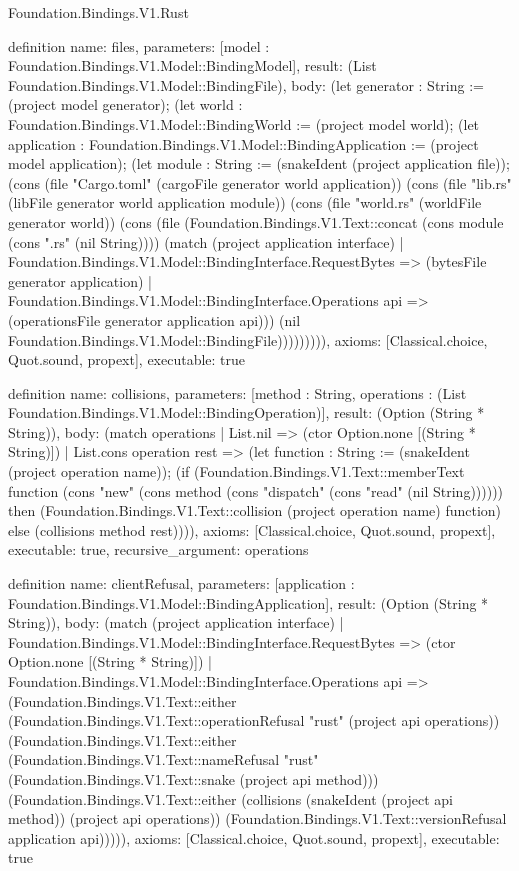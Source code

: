 \begin{lexlean}{Foundation.Bindings.V1.Rust}
\begin{semanticmodule}
definition{
  name: files,
  parameters: [model : Foundation.Bindings.V1.Model::BindingModel],
  result: (List Foundation.Bindings.V1.Model::BindingFile),
  body: (let generator : String := (project model generator); (let world : Foundation.Bindings.V1.Model::BindingWorld := (project model world); (let application : Foundation.Bindings.V1.Model::BindingApplication := (project model application); (let module : String := (snakeIdent (project application file)); (cons (file "Cargo.toml" (cargoFile generator world application)) (cons (file "lib.rs" (libFile generator world application module)) (cons (file "world.rs" (worldFile generator world)) (cons (file (Foundation.Bindings.V1.Text::concat (cons module (cons ".rs" (nil String)))) (match (project application interface)
    | Foundation.Bindings.V1.Model::BindingInterface.RequestBytes => (bytesFile generator application)
    | Foundation.Bindings.V1.Model::BindingInterface.Operations api => (operationsFile generator application api))) (nil Foundation.Bindings.V1.Model::BindingFile))))))))),
  axioms: [Classical.choice, Quot.sound, propext],
  executable: true
}

definition{
  name: collisions,
  parameters: [method : String, operations : (List Foundation.Bindings.V1.Model::BindingOperation)],
  result: (Option (String * String)),
  body: (match operations
    | List.nil => (ctor Option.none [(String * String)])
    | List.cons operation rest => (let function : String := (snakeIdent (project operation name)); (if (Foundation.Bindings.V1.Text::memberText function (cons "new" (cons method (cons "dispatch" (cons "read" (nil String)))))) then (Foundation.Bindings.V1.Text::collision (project operation name) function) else (collisions method rest)))),
  axioms: [Classical.choice, Quot.sound, propext],
  executable: true,
  recursive_argument: operations
}

definition{
  name: clientRefusal,
  parameters: [application : Foundation.Bindings.V1.Model::BindingApplication],
  result: (Option (String * String)),
  body: (match (project application interface)
    | Foundation.Bindings.V1.Model::BindingInterface.RequestBytes => (ctor Option.none [(String * String)])
    | Foundation.Bindings.V1.Model::BindingInterface.Operations api => (Foundation.Bindings.V1.Text::either (Foundation.Bindings.V1.Text::operationRefusal "rust" (project api operations)) (Foundation.Bindings.V1.Text::either (Foundation.Bindings.V1.Text::nameRefusal "rust" (Foundation.Bindings.V1.Text::snake (project api method))) (Foundation.Bindings.V1.Text::either (collisions (snakeIdent (project api method)) (project api operations)) (Foundation.Bindings.V1.Text::versionRefusal application api))))),
  axioms: [Classical.choice, Quot.sound, propext],
  executable: true
}


\end{semanticmodule}
\end{lexlean}
